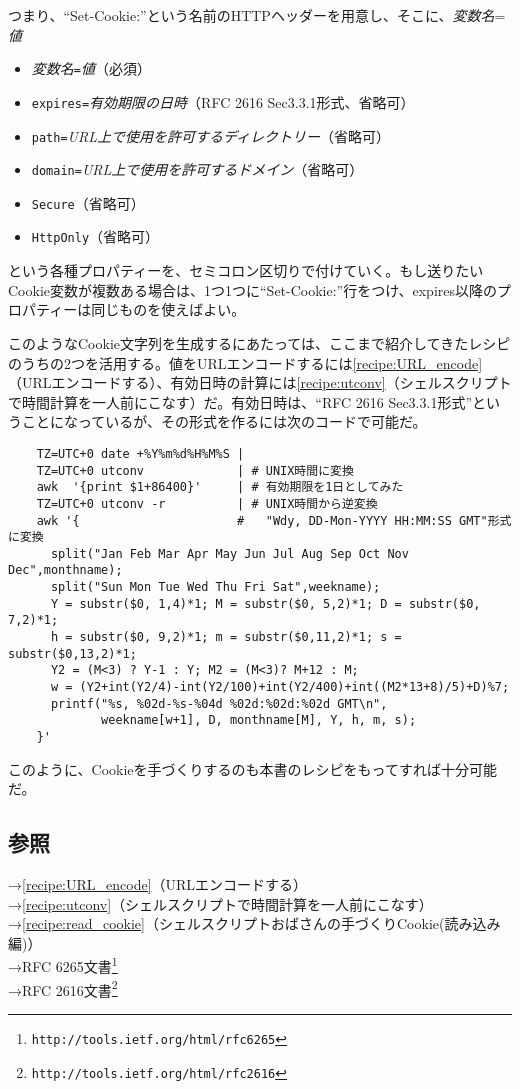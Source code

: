 つまり、``Set-Cookie:''という名前のHTTPヘッダーを用意し、そこに、\textit{変数名}=\textit{値}
\begin{itemize}
  \item \textit{変数名}\verb|=|\textit{値}（必須）
  \item \verb|expires=|\textit{有効期限の日時}（RFC 2616 Sec3.3.1形式、省略可）
  \item \verb|path=|\textit{URL上で使用を許可するディレクトリー}（省略可）
  \item \verb|domain=|\textit{URL上で使用を許可するドメイン}（省略可）
  \item \verb|Secure|（省略可）
  \item \verb|HttpOnly|（省略可）
\end{itemize}
という各種プロパティーを、セミコロン区切りで付けていく。もし送りたいCookie変数が複数ある場合は、1つ1つに``Set-Cookie:''行をつけ、expires以降のプロパティーは同じものを使えばよい。

このようなCookie文字列を生成するにあたっては、ここまで紹介してきたレシピのうちの2つを活用する。値をURLエンコードするには\ref{recipe:URL_encode}（URLエンコードする）、有効日時の計算には\ref{recipe:utconv}（シェルスクリプトで時間計算を一人前にこなす）だ。有効日時は、``RFC 2616 Sec3.3.1形式''ということになっているが、その形式を作るには次のコードで可能だ。\\
\begin{frameboxit}{160.0mm}
\begin{verbatim}
	TZ=UTC+0 date +%Y%m%d%H%M%S |
	TZ=UTC+0 utconv             | # UNIX時間に変換
	awk  '{print $1+86400}'     | # 有効期限を1日としてみた
	TZ=UTC+0 utconv -r          | # UNIX時間から逆変換
	awk '{                      #   "Wdy, DD-Mon-YYYY HH:MM:SS GMT"形式に変換
	  split("Jan Feb Mar Apr May Jun Jul Aug Sep Oct Nov Dec",monthname);
	  split("Sun Mon Tue Wed Thu Fri Sat",weekname);
	  Y = substr($0, 1,4)*1; M = substr($0, 5,2)*1; D = substr($0, 7,2)*1;
	  h = substr($0, 9,2)*1; m = substr($0,11,2)*1; s = substr($0,13,2)*1;
	  Y2 = (M<3) ? Y-1 : Y; M2 = (M<3)? M+12 : M;
	  w = (Y2+int(Y2/4)-int(Y2/100)+int(Y2/400)+int((M2*13+8)/5)+D)%7;
	  printf("%s, %02d-%s-%04d %02d:%02d:%02d GMT\n",
	         weekname[w+1], D, monthname[M], Y, h, m, s);
	}'
\end{verbatim}
\end{frameboxit}

このように、Cookieを手づくりするのも本書のレシピをもってすれば十分可能だ。


\subsection*{参照}

\noindent
→\ref{recipe:URL_encode}（URLエンコードする） \\
→\ref{recipe:utconv}（シェルスクリプトで時間計算を一人前にこなす） \\
→\ref{recipe:read_cookie}（シェルスクリプトおばさんの手づくりCookie(読み込み編)） \\
→RFC 6265文書\footnote{\verb|http://tools.ietf.org/html/rfc6265|} \\
→RFC 2616文書\footnote{\verb|http://tools.ietf.org/html/rfc2616|}
